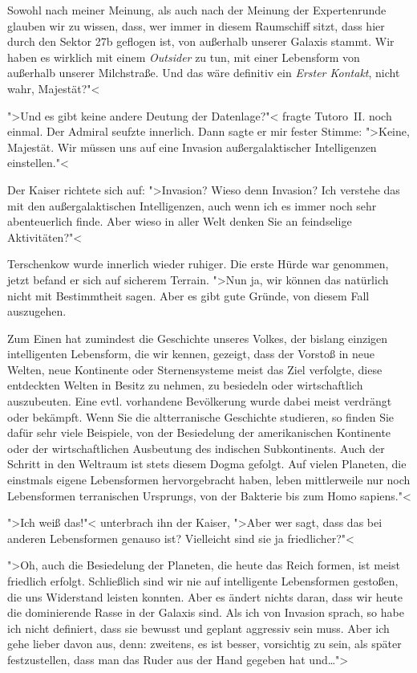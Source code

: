 \documentclass[11pt,twoside,openany]{scrbook}
\begin{document}
Sowohl nach meiner Meinung, als auch nach der Meinung der Expertenrunde glauben wir zu wissen, dass, wer immer in diesem Raumschiff sitzt, dass hier durch den Sektor \textsf{27b} geflogen ist, von außerhalb unserer Galaxis stammt. Wir haben es wirklich mit einem \emph{Outsider} zu tun, mit einer Lebensform von außerhalb unserer Milchstraße. Und das wäre definitiv ein \emph{Erster Kontakt}, nicht wahr, Majestät?"<

">Und es gibt keine andere Deutung der Datenlage?"< fragte Tutoro~II. noch einmal. Der Admiral seufzte innerlich. Dann sagte er mir fester Stimme: ">Keine, Majestät. Wir müssen uns auf eine Invasion außergalaktischer Intelligenzen einstellen."<

Der Kaiser richtete sich auf: ">Invasion? Wieso denn Invasion? Ich verstehe das mit den außergalaktischen Intelligenzen, auch wenn ich es immer noch sehr abenteuerlich finde. Aber wieso in aller Welt denken Sie an feindselige Aktivitäten?"<

Terschenkow wurde innerlich wieder ruhiger. Die erste Hürde war genommen, jetzt befand er sich auf sicherem Terrain. ">Nun ja, wir können das natürlich nicht mit Bestimmtheit sagen. Aber es gibt gute Gründe, von diesem Fall auszugehen.

Zum Einen hat zumindest die Geschichte unseres Volkes, der bislang einzigen intelligenten Lebensform, die wir kennen, gezeigt, dass der Vorstoß in neue Welten, neue Kontinente oder Sternensysteme meist das Ziel verfolgte, diese entdeckten Welten in Besitz zu nehmen, zu besiedeln oder wirtschaftlich auszubeuten. Eine evtl. vorhandene Bevölkerung wurde dabei meist verdrängt oder bekämpft. Wenn Sie die altterranische Geschichte studieren, so finden Sie dafür sehr viele Beispiele, von der Besiedelung der amerikanischen Kontinente oder der wirtschaftlichen Ausbeutung des indischen Subkontinents. Auch der Schritt in den Weltraum ist stets diesem Dogma gefolgt. Auf vielen Planeten, die einstmals eigene Lebensformen hervorgebracht haben, leben mittlerweile nur noch Lebensformen terranischen Ursprungs, von der Bakterie bis zum Homo sapiens."<

">Ich weiß das!"< unterbrach ihn der Kaiser, ">Aber wer sagt, dass das bei anderen Lebensformen genauso ist? Vielleicht sind sie ja friedlicher?"<

">Oh, auch die Besiedelung der Planeten, die heute das Reich formen, ist meist friedlich erfolgt. Schließlich sind wir nie auf intelligente Lebensformen gestoßen, die uns Widerstand leisten konnten. Aber es ändert nichts daran, dass wir heute die dominierende Rasse in der Galaxis sind. Als ich von Invasion sprach, so habe ich nicht definiert, dass sie bewusst und geplant aggressiv sein muss. Aber ich gehe lieber davon aus, denn: zweitens, es ist besser, vorsichtig zu sein, als später festzustellen, dass man das Ruder aus der Hand gegeben hat und\dots">
\end{document}
